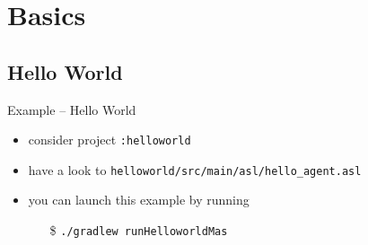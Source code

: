 \documentclass[presentation]{beamer}\mode<presentation>{\usetheme{AMSBolognaFC}}
\begin{document}
\section{\jason{} Basics}

\setcounter{JasonExample}{1}

\subsection{Hello World}

\begin{frame}[c]{Example \theJasonExample{} -- Hello World}
    
    
    \begin{itemize}
        \item consider project \texttt{:helloworld}
        
        \vfill
        
        \item have a look to \texttt{helloworld/src/main/asl/\alert{hello\_agent.asl}}
        
        
        \vfill
        
        \item you can launch this example by running
        \begin{itemize}
            \item[\$] \texttt{./gradlew runHelloworldMas}
        \end{itemize}
    \end{itemize}
\end{frame} 
\end{document}
